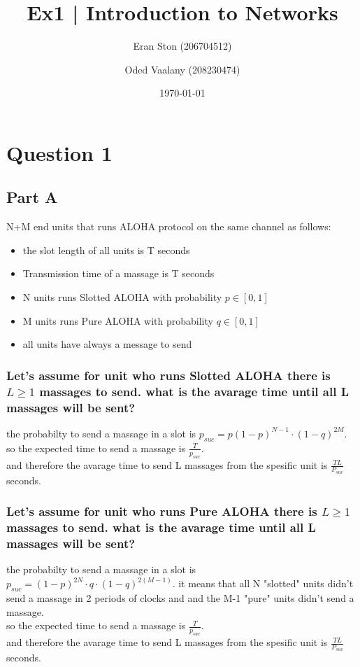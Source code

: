 \documentclass{article}
\title{Ex1 | Introduction to Networks}
\author{Eran Ston (206704512) \and Oded Vaalany (208230474)}
\date{\today}
\begin{document}
\maketitle
\section{Question 1}
\subsection{Part A}
N+M end units that runs ALOHA protocol on the same channel as follows:
\begin{itemize}
    \item the slot length of all units is T seconds
    \item Transmission time of a massage is T seconds
    \item N units runs Slotted ALOHA with probability $p \in [0,1]$
    \item M units runs Pure ALOHA with probability $q\in [0,1]$
    \item all units have always a message to send
\end{itemize}
\subsubsection{Let's assume for unit who runs Slotted ALOHA there is $L \geq 1$ massages to send. what is the avarage time until all L massages will be sent?}
the probabilty to send a massage in a slot is $p_{suc} = p(1-p)^{N-1} \cdot (1-q)^{2M}$.\\
so the expected time to send a massage is $\frac{T}{p_{suc}}$.\\
and therefore the avarage time to send L massages from the spesific unit is $\frac{TL}{P_{suc}}$ seconds.\\

\subsubsection{Let's assume for unit who runs Pure ALOHA there is $L \geq 1$ massages to send. what is the avarage time until all L massages will be sent?}
the probabilty to send a massage in a slot is $p_{suc} = (1-p)^{2N} \cdot q\cdot(1-q)^{2(M-1)}$. it means that all N "slotted" units didn't send a massage in 2 periods of clocks and and the M-1 "pure" units didn't send a massage.\\
so the expected time to send a massage is $\frac{T}{p_{suc}}$.\\
and therefore the avarage time to send L massages from the spesific unit is $\frac{TL}{P_{suc}}$ seconds.\\
\end{document}
